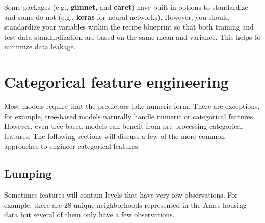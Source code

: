 \documentclass[]{krantz}
\makeatletter
\newenvironment{Shaded}{\begin{snugshade}}{\end{snugshade}}
\newcommand{\CommentTok}[1]{\textcolor[rgb]{0.37,0.37,0.37}{\textit{#1}}}
\newcommand{\KeywordTok}[1]{\textcolor[rgb]{0.27,0.27,0.27}{\textbf{#1}}}
\newcommand{\NormalTok}[1]{#1}
\newcommand{\OperatorTok}[1]{\textcolor[rgb]{0.43,0.43,0.43}{\textbf{#1}}}
\newcommand{\StringTok}[1]{\textcolor[rgb]{0.5,0.5,0.5}{#1}}
\newenvironment{kframe}{%
\medskip{}
\setlength{\fboxsep}{.8em}
 \def\at@end@of@kframe{}%
 \ifinner\ifhmode%
  \def\at@end@of@kframe{\end{minipage}}%
  \begin{minipage}{\columnwidth}%
 \fi\fi%
 \def\FrameCommand##1{\hskip\@totalleftmargin \hskip-\fboxsep
 \colorbox{shadecolor}{##1}\hskip-\fboxsep
     \hskip-\linewidth \hskip-\@totalleftmargin \hskip\columnwidth}%
 \MakeFramed {\advance\hsize-\width
   \@totalleftmargin\z@ \linewidth\hsize
   \@setminipage}}%
 {\par\unskip\endMakeFramed%
 \at@end@of@kframe}
\renewenvironment{Shaded}{\begin{kframe}}{\end{kframe}}
\makeatother
\begin{document}
Some packages (e.g., \textbf{glmnet}, and \textbf{caret}) have built-in options to standardize and some do not (e.g., \textbf{keras} for neural networks). However, you should standardize your variables within the recipe blueprint so that both training and test data standardization are based on the same mean and variance. This helps to minimize data leakage.

\begin{Shaded}
\end{Shaded}

\hypertarget{categorical-feature-engineering}{%
\section{Categorical feature engineering}\label{categorical-feature-engineering}}

Most models require that the predictors take numeric form. There are exceptions, for example, tree-based models naturally handle numeric or categorical features. However, even tree-based models can benefit from pre-processing categorical features. The following sections will discuss a few of the more common approaches to engineer categorical features.

\hypertarget{lumping}{%
\subsection{Lumping}\label{lumping}}

Sometimes features will contain levels that have very few observations. For example, there are 28 unique neighborhoods represented in the Ames housing data but several of them only have a few observations.
\end{document}
